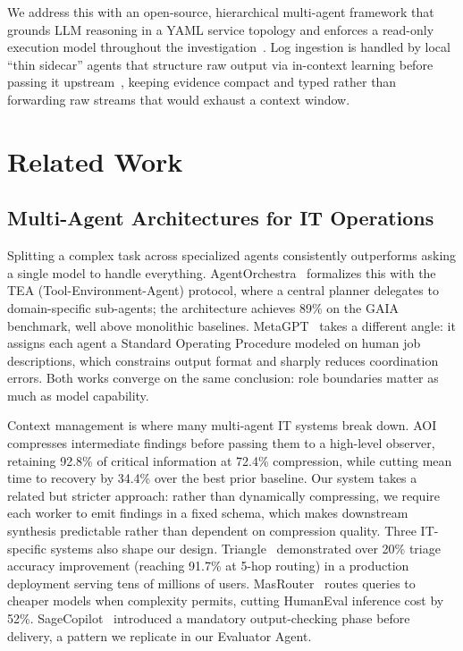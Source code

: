 \documentclass[conference]{IEEEtran}
\begin{document}
We address this with an open-source, hierarchical multi-agent framework that grounds LLM
reasoning in a YAML service topology and enforces a read-only execution model throughout the
investigation~\cite{kholkar2025safeops}. Log ingestion is handled by local ``thin sidecar''
agents that structure raw output via in-context learning before passing it upstream~\cite{xu2024divlog},
keeping evidence compact and typed rather than forwarding raw streams that would exhaust a
context window.



\section{Related Work}

\subsection{Multi-Agent Architectures for IT Operations}
Splitting a complex task across specialized agents consistently outperforms asking a single
model to handle everything. AgentOrchestra~\cite{zhang2025agentorchestra} formalizes this
with the TEA (Tool-Environment-Agent) protocol, where a central planner delegates to
domain-specific sub-agents; the architecture achieves 89\% on the GAIA benchmark, well above
monolithic baselines. MetaGPT~\cite{hong2024metagpt} takes a different angle: it assigns each
agent a Standard Operating Procedure modeled on human job descriptions, which constrains
output format and sharply reduces coordination errors. Both works converge on the same
conclusion: role boundaries matter as much as model capability.

Context management is where many multi-agent IT systems break down. AOI~\cite{bai2025aoi}
compresses intermediate findings before passing them to a high-level observer, retaining 92.8\%
of critical information at 72.4\% compression, while cutting mean time to recovery by 34.4\%
over the best prior baseline. Our system takes a related but stricter approach: rather than
dynamically compressing, we require each worker to emit findings in a fixed schema, which makes
downstream synthesis predictable rather than dependent on compression quality. Three IT-specific
systems also shape our design. Triangle~\cite{yu2025triangle} demonstrated over 20\% triage
accuracy improvement (reaching 91.7\% at 5-hop routing) in a production deployment serving
tens of millions of users. MasRouter~\cite{yue2025masrouter} routes queries to cheaper models
when complexity permits, cutting HumanEval inference cost by 52\%. SageCopilot~\cite{liao2025sagecopilot}
introduced a mandatory output-checking phase before delivery, a pattern we replicate in our
Evaluator Agent.
\end{document}
